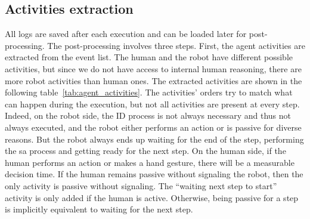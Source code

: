 \subsection{Activities extraction}

All logs are saved after each execution and can be loaded later for post-processing. The post-processing involves three steps. First, the agent activities are extracted from the event list. The human and the robot have different possible activities, but since we do not have access to internal human reasoning, there are more robot activities than human ones. The extracted activities are shown in the following table~\ref{tab:agent_activities}. The activities' orders try to match what can happen during the execution, but not all activities are present at every step. Indeed, on the robot side, the ID process is not always necessary and thus not always executed, and the robot either performs an action or is passive for diverse reasons. But the robot always ends up waiting for the end of the step, performing the \acrshort{sa} process and getting ready for the next step. On the human side, if the human performs an action or makes a hand gesture, there will be a measurable decision time. If the human remains passive without signaling the robot, then the only activity is passive without signaling. The ``waiting next step to start'' activity is only added if the human is active. Otherwise, being passive for a step is implicitly equivalent to waiting for the next step.  

